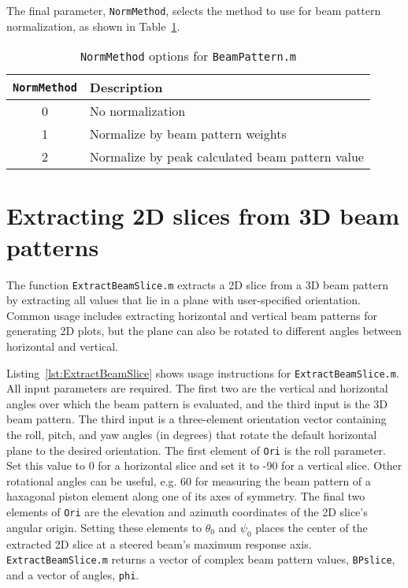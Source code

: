 The final parameter, \texttt{NormMethod},  selects the method to use for beam pattern normalization, as shown in Table~\ref{tab:BeamPatternNormMethod}.

\begin{table}[!ht]
	\begin{center}
		\caption{\texttt{NormMethod} options for \texttt{BeamPattern.m}}
		\label{tab:BeamPatternNormMethod}
		\begin{tabular}{c|l} 
			\texttt{NormMethod} & \textbf{Description} \\
			\hline
			0 & No normalization\\
			1 & Normalize by beam pattern weights \\
			2 & Normalize by peak calculated beam pattern value\\
		\end{tabular}
	\end{center}
\end{table}

\clearpage



\section{Extracting 2D slices from 3D beam patterns}

The function \texttt{ExtractBeamSlice.m} extracts a 2D slice from a 3D beam pattern by extracting all values that lie in a plane with user-specified orientation. Common usage includes extracting horizontal and vertical beam patterns for generating 2D plots, but the plane can also be rotated to different angles between horizontal and vertical. 

Listing~\ref{lst:ExtractBeamSlice} shows usage instructions for \texttt{ExtractBeamSlice.m}. All input parameters are required. The first two are the vertical and horizontal angles over which the beam pattern is evaluated, and the third input is the 3D beam pattern. The third input is a three-element orientation vector containing the roll, pitch, and yaw angles (in degrees) that rotate the default horizontal plane to the desired orientation. The first element of \texttt{Ori} is the roll parameter. Set this value to 0 for a horizontal slice and set it to -90 for a vertical slice. Other rotational angles can be useful, e.g. 60 for measuring the beam pattern of a haxagonal piston element along one of its axes of symmetry. The final two elements of \texttt{Ori} are the elevation and azimuth coordinates of the 2D slice's angular origin. Setting these elements to $\theta_0$ and $\psi_0$ places the center of the extracted 2D slice at a steered beam's maximum response axis. \texttt{ExtractBeamSlice.m} returns a vector of complex beam pattern values, \texttt{BPslice},  and a vector of angles, \texttt{phi}.

